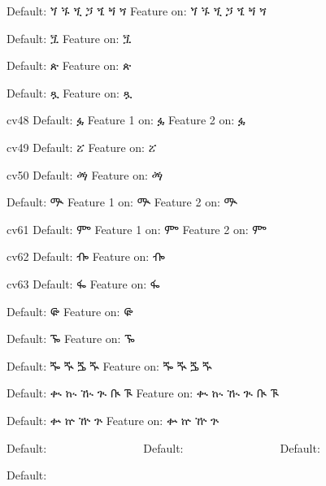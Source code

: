 \IndSS Default: ጘ ጙ ጚ ጛ ጜ ጝ ጞ
\IndSS\OTfortyoneone Feature on: ጘ ጙ ጚ ጛ ጜ ጝ ጞ

\IndSS Default: ጟ
\IndSS\OTfortytwoone Feature on: ጟ

\IndSS Default: ጵ
\IndSS\OTfortyfive Feature on: ጵ

\IndSS Default: ጿ
\IndSS\OTfortysix Feature on: ጿ

\IndSS cv48 Default: ፏ
\IndSS\OTfortyeightone Feature 1 on: ፏ
\IndSS\OTfortyeighttwo Feature 2 on: ፏ

\IndSS cv49 Default: ፘ
\IndSS\OTfortynine Feature on: ፘ

\IndSS cv50 Default: ፙ
\IndSS\OTfifty Feature on: ፙ

\IndSS Default: ᎁ
\IndSS\OTsixtyone Feature 1 on: ᎁ
\IndSS\OTsixtytwo Feature 2 on: ᎁ

\IndSS cv61  Default: ᎃ
\IndSS\OTsixtyoneone Feature 1 on: ᎃ
\IndSS\OTsixtyonetwo Feature 2 on: ᎃ

\IndSS cv62 Default: ᎇ
\IndSS\OTsixtytwoone Feature on: ᎇ

\IndSS cv63 Default: ᎊ
\IndSS\OTsixtythree Feature on: ᎊ

\IndSS Default: ᎋ
\IndSS\OTsixtyfour Feature on: ᎋ

\IndSS Default: ᎏ
\IndSS\OTsixtyfive Feature on: ᎏ

\IndSS Default: ⶓ ⶔ ⶕ ⶖ
\IndSS\OTseventy Feature on: ⶓ ⶔ ⶕ ⶖ

\IndSS Default: ቊ ኲ ዂ ጒ ᎅ ᎍ
\IndSS\OTeighty Feature on: ቊ ኲ ዂ ጒ ᎅ ᎍ

\IndSS Default: ቍ ኵ ዅ ጕ 
\IndSS\OTeightyfive Feature on: ቍ ኵ ዅ ጕ

\IndSS Default: 𞟠𞟡𞟢𞟣𞟤𞟥𞟦𞟨𞟩𞟪𞟫𞟭𞟮𞟰𞟱𞟲𞟳𞟴𞟵𞟶𞟷𞟸𞟹𞟺𞟻𞟼𞟽𞟾
\IndSS Default: 𞟠፟𞟡፟𞟢፟𞟣፟𞟤፟𞟥፟𞟦፟𞟨፟𞟩፟𞟪፟𞟫፟𞟭፟𞟮፟𞟰፟𞟱፟𞟲፟𞟳፟𞟴፟𞟵፟𞟶፟𞟷፟𞟸፟𞟹፟𞟺፟𞟻፟𞟼፟𞟽፟𞟾፟
\IndSS Default: 𞟫፟ሕ፟𞟲፟ቅ፟

\IndSS Default: 𞟠 𞟡 𞟢 𞟣 𞟤 𞟥 𞟦 𞟨 𞟩 𞟪 𞟫 𞟭 𞟮 𞟰 𞟱 𞟲 𞟳 𞟴 𞟵 𞟶 𞟷 𞟸 𞟹 𞟺 𞟻 𞟼 𞟽 𞟾
\bye
